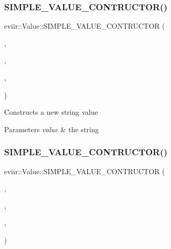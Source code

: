 \subsubsection{\texorpdfstring{S\+I\+M\+P\+L\+E\+\_\+\+V\+A\+L\+U\+E\+\_\+\+C\+O\+N\+T\+R\+U\+C\+T\+O\+R()}{SIMPLE\_VALUE\_CONTRUCTOR()}\hspace{0.1cm}{\footnotesize\ttfamily [3/7]}}
{\footnotesize\ttfamily eviir\+::\+Value\+::\+S\+I\+M\+P\+L\+E\+\_\+\+V\+A\+L\+U\+E\+\_\+\+C\+O\+N\+T\+R\+U\+C\+T\+OR (\begin{DoxyParamCaption}\item[{\hyperlink{classeviir_1_1StringValue}{String\+Value}}]{,  }\item[{string}]{,  }\item[{string}]{,  }\item[{value}]{ }\end{DoxyParamCaption})}

Constructs a new string value 
\begin{DoxyParams}{Parameters}
{\em value} & the string \\
\hline
\end{DoxyParams}
\mbox{\label{classeviir_1_1Value_aaa32965c6f0535817b09cacd75b30c67}} 
\subsubsection{\texorpdfstring{S\+I\+M\+P\+L\+E\+\_\+\+V\+A\+L\+U\+E\+\_\+\+C\+O\+N\+T\+R\+U\+C\+T\+O\+R()}{SIMPLE\_VALUE\_CONTRUCTOR()}\hspace{0.1cm}{\footnotesize\ttfamily [4/7]}}
{\footnotesize\ttfamily eviir\+::\+Value\+::\+S\+I\+M\+P\+L\+E\+\_\+\+V\+A\+L\+U\+E\+\_\+\+C\+O\+N\+T\+R\+U\+C\+T\+OR (\begin{DoxyParamCaption}\item[{\hyperlink{classeviir_1_1ListValue}{List\+Value}}]{,  }\item[{list}]{,  }\item[{vector$<$ \hyperlink{classeviir_1_1Value}{Value} $\ast$$>$}]{,  }\item[{elements}]{ }\end{DoxyParamCaption})}

